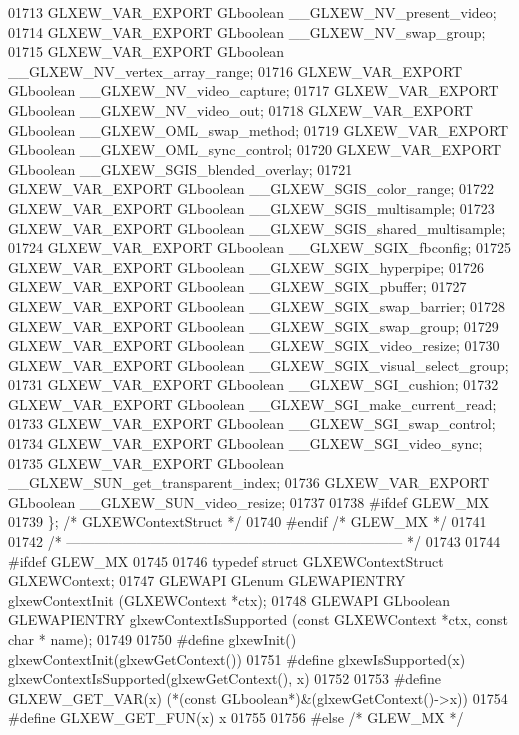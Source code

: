 \begin{DoxyCode}
01713 GLXEW_VAR_EXPORT GLboolean __GLXEW_NV_present_video;
01714 GLXEW_VAR_EXPORT GLboolean __GLXEW_NV_swap_group;
01715 GLXEW_VAR_EXPORT GLboolean __GLXEW_NV_vertex_array_range;
01716 GLXEW_VAR_EXPORT GLboolean __GLXEW_NV_video_capture;
01717 GLXEW_VAR_EXPORT GLboolean __GLXEW_NV_video_out;
01718 GLXEW_VAR_EXPORT GLboolean __GLXEW_OML_swap_method;
01719 GLXEW_VAR_EXPORT GLboolean __GLXEW_OML_sync_control;
01720 GLXEW_VAR_EXPORT GLboolean __GLXEW_SGIS_blended_overlay;
01721 GLXEW_VAR_EXPORT GLboolean __GLXEW_SGIS_color_range;
01722 GLXEW_VAR_EXPORT GLboolean __GLXEW_SGIS_multisample;
01723 GLXEW_VAR_EXPORT GLboolean __GLXEW_SGIS_shared_multisample;
01724 GLXEW_VAR_EXPORT GLboolean __GLXEW_SGIX_fbconfig;
01725 GLXEW_VAR_EXPORT GLboolean __GLXEW_SGIX_hyperpipe;
01726 GLXEW_VAR_EXPORT GLboolean __GLXEW_SGIX_pbuffer;
01727 GLXEW_VAR_EXPORT GLboolean __GLXEW_SGIX_swap_barrier;
01728 GLXEW_VAR_EXPORT GLboolean __GLXEW_SGIX_swap_group;
01729 GLXEW_VAR_EXPORT GLboolean __GLXEW_SGIX_video_resize;
01730 GLXEW_VAR_EXPORT GLboolean __GLXEW_SGIX_visual_select_group;
01731 GLXEW_VAR_EXPORT GLboolean __GLXEW_SGI_cushion;
01732 GLXEW_VAR_EXPORT GLboolean __GLXEW_SGI_make_current_read;
01733 GLXEW_VAR_EXPORT GLboolean __GLXEW_SGI_swap_control;
01734 GLXEW_VAR_EXPORT GLboolean __GLXEW_SGI_video_sync;
01735 GLXEW_VAR_EXPORT GLboolean __GLXEW_SUN_get_transparent_index;
01736 GLXEW_VAR_EXPORT GLboolean __GLXEW_SUN_video_resize;
01737 
01738 \textcolor{preprocessor}{#ifdef GLEW\_MX}
01739 \}; \textcolor{comment}{/* GLXEWContextStruct */}
01740 \textcolor{preprocessor}{#endif }\textcolor{comment}{/* GLEW\_MX */}\textcolor{preprocessor}{}
01741 
01742 \textcolor{comment}{/* ------------------------------------------------------------------------ */}
01743 
01744 \textcolor{preprocessor}{#ifdef GLEW\_MX}
01745 
01746 \textcolor{keyword}{typedef} \textcolor{keyword}{struct }GLXEWContextStruct GLXEWContext;
01747 GLEWAPI GLenum GLEWAPIENTRY glxewContextInit (GLXEWContext *ctx);
01748 GLEWAPI GLboolean GLEWAPIENTRY glxewContextIsSupported (\textcolor{keyword}{const} GLXEWContext *ctx, \textcolor{keyword}{const} \textcolor{keywordtype}{char} *
      name);
01749 
01750 \textcolor{preprocessor}{#define glxewInit() glxewContextInit(glxewGetContext())}
01751 \textcolor{preprocessor}{#define glxewIsSupported(x) glxewContextIsSupported(glxewGetContext(), x)}
01752 
01753 \textcolor{preprocessor}{#define GLXEW\_GET\_VAR(x) (*(const GLboolean*)&(glxewGetContext()->x))}
01754 \textcolor{preprocessor}{#define GLXEW\_GET\_FUN(x) x}
01755 
01756 \textcolor{preprocessor}{#else }\textcolor{comment}{/* GLEW\_MX */}\textcolor{preprocessor}{}

\end{DoxyCode}

